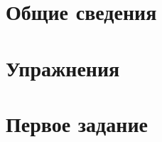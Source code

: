 


% 


\section{Общие сведения}


\section{Упражнения}








\section{Первое задание}







% 

